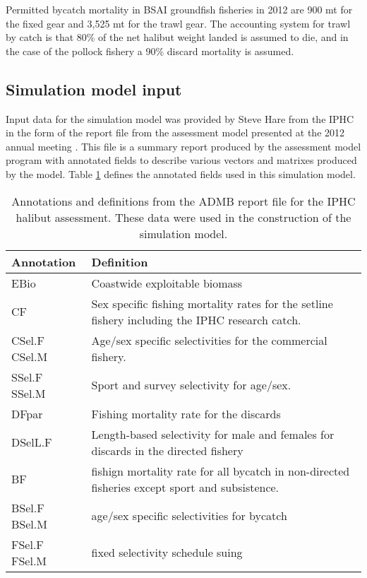Permitted bycatch mortality in BSAI groundfish fisheries in 2012 are 900 mt for the fixed gear and 3,525 mt for the trawl gear.  The accounting system for trawl by catch is that 80\% of the net halibut weight landed is assumed to die, and in the case of the pollock fishery a 90\% discard mortality is assumed.

\subsection{Simulation model input} %
\label{sub:simulation_model_input}

Input data for the simulation model was provided by Steve Hare from the IPHC in the form of the report file from the assessment model presented at the 2012 annual meeting \citep{Hare2012Rara}.  This file is a summary report produced by the assessment model program with annotated fields to describe various vectors and matrixes produced by the model.  Table \ref{tab:wobblesq.rep} defines the annotated fields used in this simulation model.

\begin{table}
	\caption{Annotations and definitions from the ADMB report file for the IPHC halibut assessment. These data were used in the construction of the simulation model.}
	\label{tab:wobblesq.rep}
	\begin{center}
	\begin{tabular}{p{2cm}p{13.5cm}}
		\hline
		Annotation & Definition \\
		\hline
		EBio & Coastwide exploitable biomass\\ \hline
		
		CF   & Sex specific fishing mortality rates for the setline fishery including the IPHC research catch.\\ \hline
		
		CSel.F  CSel.M & Age/sex specific selectivities for the commercial fishery.  \\ \hline
		
		SSel.F  SSel.M & Sport and survey selectivity for age/sex. \\ \hline
		
		DFpar   & Fishing mortality rate for the discards \\ \hline
		
		DSelL.F & Length-based selectivity for male and females for discards in the directed fishery \\ \hline
		
		BF & fishign mortality rate for all bycatch in non-directed fisheries except sport and subsistence. \\ \hline
		
		BSel.F BSel.M  & age/sex specific selectivities for bycatch\\ \hline
		
		FSel.F FSel.M  & fixed selectivity schedule suing
		\hline
	\end{tabular}
	\end{center}
\end{table}

